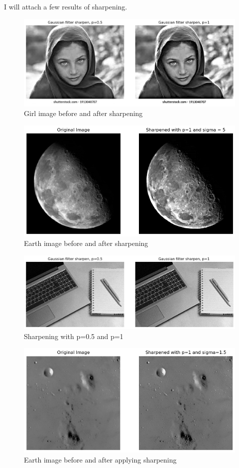 \documentclass[12pt]{article}
\begin{document}
I will attach a few results of sharpening. 
\begin{figure}[h]
    \centering
    \includegraphics[width=0.75\linewidth]{girl.png}
    \caption{Girl image before and after sharpening}
    \label{fig:placeholder}
\end{figure}
\begin{figure}
    \centering
    \includegraphics[width=0.5\linewidth]{earth.png}
    \caption{Earth image before and after sharpening}
    \label{fig:placeholder}
\end{figure}
\begin{figure}
    \centering
    \includegraphics[width=1\linewidth]{study.png}
    \caption{Sharpening with p=0.5 and p=1}
    \label{fig:placeholder}
\end{figure}

\begin{figure}
    \centering
    \includegraphics[width=1\linewidth]{land.png}
    \caption{Earth image before and after applying sharpening}
    \label{fig:placeholder}
\end{figure}
\end{document}
